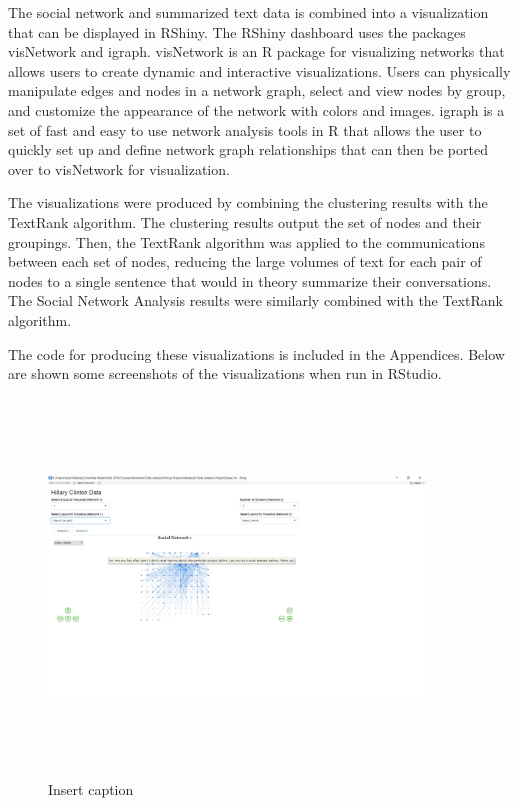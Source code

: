 The social network and summarized text data is combined into a visualization that can be displayed in RShiny. The RShiny dashboard uses the packages visNetwork and igraph. visNetwork is an R package for visualizing networks that allows users to create dynamic and interactive visualizations. Users can physically manipulate edges and nodes in a network graph, select and view nodes by group, and customize the appearance of the network with colors and images. igraph is a set of fast and easy to use network analysis tools in R that allows the user to quickly set up and define network graph relationships that can then be ported over to visNetwork for visualization.

The visualizations were produced by combining the clustering results with the TextRank algorithm.
The clustering results output the set of nodes and their groupings. Then, the TextRank algorithm was applied to the communications between each set of nodes, reducing the large volumes of text for each pair of nodes to a single sentence that would in theory summarize their conversations. The Social Network Analysis results were similarly combined with the TextRank algorithm.

The code for producing these visualizations is included in the Appendices. Below are shown some screenshots of the visualizations when run in RStudio.

\begin{figure}[h]
	\includegraphics[width=10cm,height=10cm]{eric/Viz Screenshot 1}
	\caption{Insert caption}
	\label{Insert label}
\end{figure}

